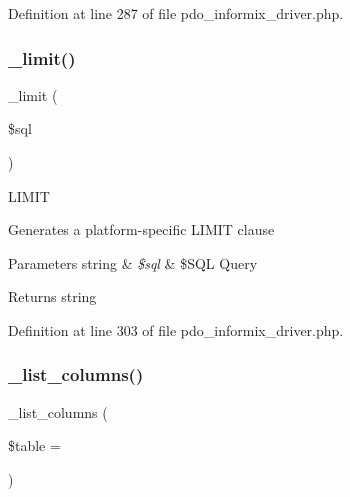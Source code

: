 Definition at line 287 of file pdo\+\_\+informix\+\_\+driver.\+php.

\mbox{\label{class_c_i___d_b__pdo__informix__driver_a3a02ea06541b8ecc25a33a61651562c8}} 
\subsubsection{\texorpdfstring{\_limit()}{\_limit()}}
{\footnotesize\ttfamily \+\_\+limit (\begin{DoxyParamCaption}\item[{}]{\$sql }\end{DoxyParamCaption})\hspace{0.3cm}{\ttfamily [protected]}}

L\+I\+M\+IT

Generates a platform-\/specific L\+I\+M\+IT clause


\begin{DoxyParams}[1]{Parameters}
string & {\em \$sql} & \$\+S\+QL Query \\
\hline
\end{DoxyParams}
\begin{DoxyReturn}{Returns}
string 
\end{DoxyReturn}


Definition at line 303 of file pdo\+\_\+informix\+\_\+driver.\+php.

\mbox{\label{class_c_i___d_b__pdo__informix__driver_a7ccb7f9c301fe7f0a9db701254142b63}} 
\subsubsection{\texorpdfstring{\_list\_columns()}{\_list\_columns()}}
{\footnotesize\ttfamily \+\_\+list\+\_\+columns (\begin{DoxyParamCaption}\item[{}]{\$table = {\ttfamily \textquotesingle{}\textquotesingle{}} }\end{DoxyParamCaption})\hspace{0.3cm}{\ttfamily [protected]}}

